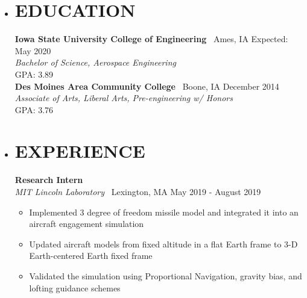 \documentclass[overlapped, 11pt]{res}
\begin{document}
\address
{
    4329 Lincoln Swing \#36 Ames, IA 50014 
    \textbar \ (641) 780-9473 
    \textbar \ carldevries@gmail.com 
    \textbar \ www.carldevries.com
}

\begin{resume}

    \begin{itemize}
    \item[]\section{EDUCATION}
        \textbf{Iowa State University College of Engineering} \textbar 
            \ Ames, IA \hfill Expected: May 2020\\
        \emph{Bachelor of Science, Aerospace Engineering} \\
            GPA: 3.89
        \\[0.5em]
        \textbf{Des Moines Area Community College} \textbar 
            \ Boone, IA \hfill December 2014\\
        \emph{Associate of Arts, Liberal Arts, Pre-engineering w/ Honors}\\
            GPA: 3.76

    \item[]\section{EXPERIENCE}

        \vspace{0.5em}
        \textbf{Research Intern}\\
        \emph{MIT Lincoln Laboratory} \textbar 
            \ Lexington, MA \hfill May 2019 - August 2019
        \begin{itemize}
            \item Implemented 3 degree of freedom missile model and integrated it into an aircraft engagement simulation
            \item Updated aircraft models from fixed altitude in a flat Earth frame to 3-D Earth-centered Earth fixed frame
            \item Validated the simulation using Proportional Navigation, gravity bias, and lofting guidance schemes
       \end{itemize}
        

\end{itemize}
\end{resume}
\end{document}
